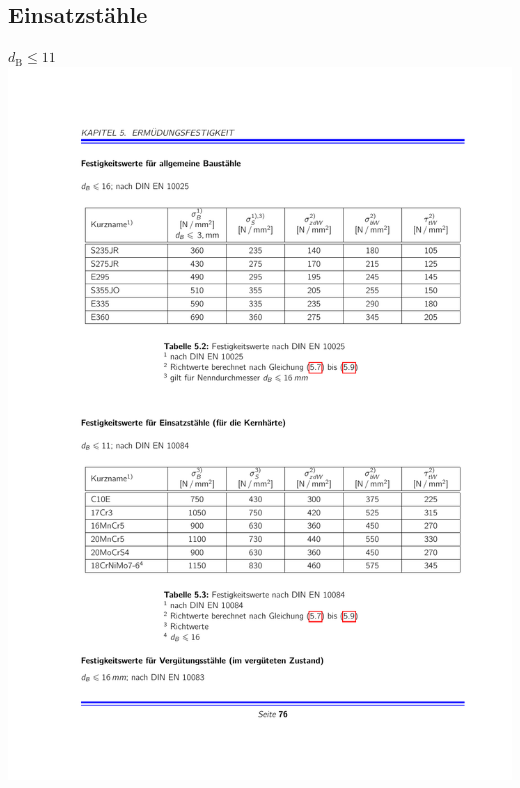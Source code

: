\begin{multicols}{3}
		\subsection{Einsatzstähle} %
			\label{einsatzstaehle}
			$d_{\text{B}} \leq 11$ \\
			\includegraphics[width=\columnwidth]{graphics/einsatzstaehle}

\end{multicols}
